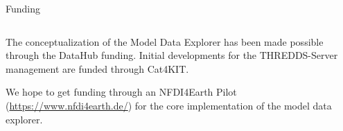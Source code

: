 \begin{frame}{Funding}
	\begin{columns}[T]

		\begin{column}{0.7\linewidth}
			The conceptualization of the Model Data Explorer has been made
			possible through the DataHub funding. Initial developments for
			the THREDDS-Server management are funded through Cat4KIT.

			We hope to get funding through an NFDI4Earth Pilot
			(\url{https://www.nfdi4earth.de/}) for the core implementation
			of the model data explorer.

			\vspace{2.3em}
			\begin{flushright}
			\end{flushright}
		\end{column}


\end{columns}
\end{frame}
